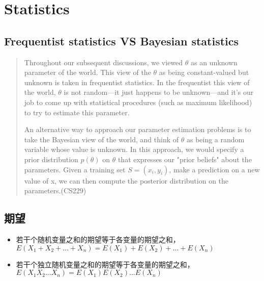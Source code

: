 \chapter{Statistics}

\section{Frequentist statistics VS Bayesian statistics}
\begin{quotation}
Throughout our subsequent discussions, we viewed $\theta$ as an unknown parameter of the world.
This view of the $\theta$ as being constant-valued but unknown is taken in frequentist statistics.
In the frequentist this view of the world, $\theta$ is not random—it just happens to be unknown—and
it's our job to come up with statistical procedures (such as maximum likelihood) to try to estimate
this parameter.

An alternative way to approach our parameter estimation problems is to take
the Bayesian view of the world, and think of $\theta$ as being a random variable whose value is
unknown. In this approach, we would specify a prior distribution $p(\theta)$ on $\theta$ that
expresses our "prior beliefs" about the parameters. Given a training set $S = {(x_i, y_i)}$,
make a prediction on a new value of x, we can then compute the posterior distribution on
the parameters.(CS229)
\end{quotation}

\section{期望}
\begin{itemize}
    \item 若干个随机变量之和的期望等于各变量的期望之和，$E(X_1 + X_2 + ... + X_n) = E(X_1) + E(X_2) + ... + E(X_n)$
    \item 若干个独立随机变量之和的期望等于各变量的期望之和，$E(X_1 X_2 ... X_n) = E(X_1)E(X_2)...E(X_n)$
\end{itemize}
